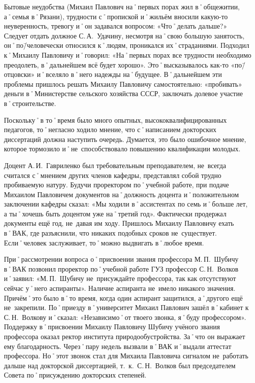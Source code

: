Бытовые неудобства (Михаил Павлович на˚первых порах жил в˚общежитии, а˚семья в˚Рязани), трудности с˚пропиской и˚жильём вносили какую-то неуверенность, тревогу и˚он задавался вопросом: «Что˚делать дальше?» Следует отдать должное С.\,А.~Удачину, несмотря на˚свою большую занятость, он˚по\=/человечески относился к˚людям, проникался их˚страданиями. Подходил к˚Михаилу Павловичу и˚говорил: «На˚первых порах все трудности необходимо преодолеть, в˚дальнейшем всё будет хорошо». Это˚высказывалось как-то «по\=/отцовски» и˚вселяло в˚него надежды на˚будущее. В˚дальнейшем эти проблемы пришлось решать Михаилу Павловичу самостоятельно: «пробивать» деньги в˚Министерстве сельского хозяйства СССР, заключать долевое участие в˚строительстве.

Поскольку˚в то˚время было много опытных, высококвалифицированных педагогов, то˚негласно ходило мнение, что с˚написанием докторских диссертаций должна наступить очередь. Думается, это было ошибочное мнение, которое тормозило и˚не~способствовало повышению квалификации молодых.

Доцент А.\,И.~Гавриленко был требовательным преподавателем, не~всегда считался с˚мнением других членов кафедры, представлял собой трудно пробиваемую натуру. Будучи проректором по˚учебной работе, при подаче Михаилом Павловичем документов на˚должность доцента и˚положительном заключении кафедры сказал: «Мы ходили в˚ассистентах по семь и˚больше лет, а ты˚хочешь быть доцентом уже на˚третий год». Фактически продержал документы ещё год, не~давая им ходу. Пришлось Михаилу Павловичу ехать в˚ВАК, где разъяснили, что никаких подобных сроков не~существует. Если˚человек заслуживает, то˚можно выдвигать в˚любое время.

При˚рассмотрении вопроса о˚присвоении звания профессора М.\,П.~Шубичу в˚ВАК позвонил проректор по˚учебной работе ГУЗ профессор С.\,Н.~Волков и˚заявил: «М.\,П.~Шубичу не~присуждайте профессора, так как отсутствуют сейчас у˚него аспиранты». Наличие аспиранта не~имело никакого значения. Причём˚это было в˚то время, когда один аспирант защитился, а˚другого ещё не~закрепили. По˚приезду в˚университет Михаил Павлович зашёл в˚кабинет к С.\,Н.~Волкову и˚сказал: «Независимо˚от твоего звонка, я˚буду профессором». Поддержку в˚присвоении Михаилу Павловичу Шубичу учёного звания профессора оказал ректор института природообустройства. За˚что он выражает ему благодарность. Через˚пару недель вызвали в˚ВАК и˚выдали аттестат профессора. Но˚этот звонок стал для Михаила Павловича сигналом не~работать дальше над докторской диссертацией, т.~к.~С.\,Н.~Волков был председателем Совета по˚присуждению докторских степеней.


